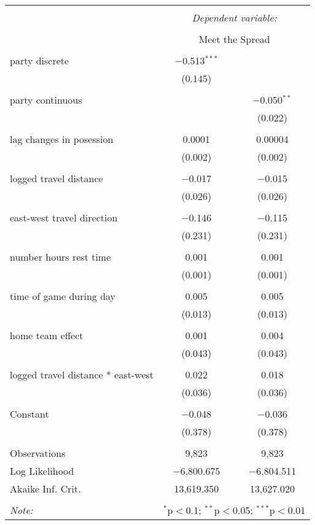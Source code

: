 \documentclass[letterpaper,12pt]{article}
\begin{document}
\begin{center}
\begin{tabular}{@{\extracolsep{5pt}}lcc}  \\[-1.8ex]\hline  \hline \\[-1.8ex]   & \multicolumn{2}{c}{\textit{Dependent variable:}} \\  \cline{2-3}  \\[-1.8ex] & \multicolumn{2}{c}{Meet the Spread} \\ \hline \\[-1.8ex]   party discrete & $-$0.513$^{***}$ &  \\    & (0.145) &  \\    & & \\   party continuous &  & $-$0.050$^{**}$ \\    &  & (0.022) \\    & & \\   lag changes in posession & 0.0001 & 0.00004 \\    & (0.002) & (0.002) \\    & & \\   logged travel distance & $-$0.017 & $-$0.015 \\    & (0.026) & (0.026) \\    & & \\   east-west travel direction & $-$0.146 & $-$0.115 \\    & (0.231) & (0.231) \\    & & \\   number hours rest time & 0.001 & 0.001 \\    & (0.001) & (0.001) \\    & & \\   time of game during day & 0.005 & 0.005 \\    & (0.013) & (0.013) \\    & & \\   home team effect & 0.001 & 0.004 \\    & (0.043) & (0.043) \\    & & \\   logged travel distance * east-west & 0.022 & 0.018 \\    & (0.036) & (0.036) \\    & & \\   Constant & $-$0.048 & $-$0.036 \\    & (0.378) & (0.378) \\ \hline \\[-1.8ex]  Observations & 9,823 & 9,823 \\  Log Likelihood & $-$6,800.675 & $-$6,804.511 \\  Akaike Inf. Crit. & 13,619.350 & 13,627.020 \\  \hline  \hline \\[-1.8ex]  \textit{Note:}  & \multicolumn{2}{r}{$^{*}$p$<$0.1; $^{**}$p$<$0.05; $^{***}$p$<$0.01}
\end{tabular} 
\end{center} 
\end{document}
